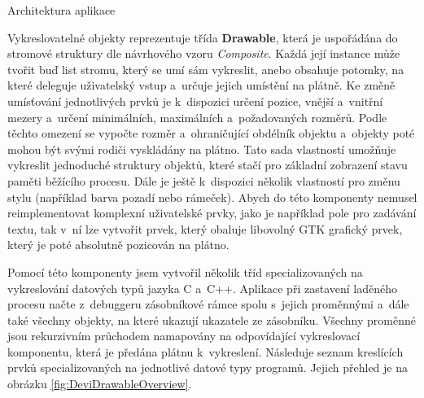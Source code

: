 \documentclass[czech,bachelor,male,python,dept460,hidelinks]{diploma}						%
\newcommand{\parspace}[1][]{
	\ifthenelse{\isempty{#1}}{\vspace{0mm}}{\vspace{#1}}
	\par
}
\begin{document}
\begin{section}{Architektura aplikace}
	\parspace Vykreslovatelné objekty reprezentuje třída \textbf{Drawable}, která je uspořádána do stromové struktury dle návrhového vzoru
	\textit{Composite}. \cite[183]{gof} Každá její instance může tvořit buď list stromu, který se umí sám vykreslit, anebo obsahuje potomky, na které deleguje
	uživatelský vstup a~určuje jejich umístění na plátně. Ke změně umísťování jednotlivých prvků je k~dispozici určení pozice, vnější a~vnitřní mezery
	a~určení minimálních, maximálních a~požadovaných rozměrů. Podle těchto omezení se vypočte rozměr a~ohraničující obdélník objektu a~objekty poté mohou být
	svými rodiči vyskládány na plátno.
	Tato sada vlastností umožňuje vykreslit jednoduché struktury objektů, které stačí pro základní zobrazení stavu paměti běžícího procesu.
	Dále je ještě k~dispozici několik vlastností pro změnu stylu (například barva pozadí nebo rámeček). Abych do této komponenty
	nemusel reimplementovat komplexní uživatelské prvky, jako je například pole pro zadávání textu, tak v~ní lze vytvořit prvek, který obaluje libovolný GTK
	grafický prvek, který je poté absolutně pozicován na plátno.
	
	\parspace Pomocí této komponenty jsem vytvořil několik tříd specializovaných na vykreslování datových typů jazyka C a~C++. Aplikace při zastavení laděného
	procesu načte z~debuggeru zásobníkové rámce spolu s~jejich proměnnými a~dále také všechny objekty, na které ukazují ukazatele ze zásobníku.
	Všechny proměnné jsou rekurzivním průchodem namapovány na odpovídající vykreslovací komponentu, která je předána plátnu k~vykreslení.
	Následuje seznam kreslících prvků specializovaných na jednotlivé datové typy programů. Jejich přehled je na obrázku \ref{fig:DeviDrawableOverview}.
	
	

\end{section}
\end{document}
